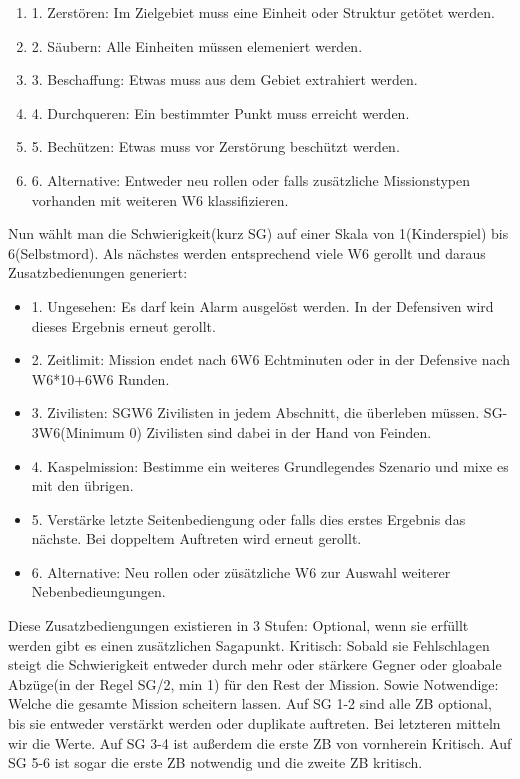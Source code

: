 \documentclass[twoside,a4paper]{minimal}
\begin{document}
\begin{multicols*}{3}
\begin{enumerate}
\item 1. Zerstören: Im Zielgebiet muss eine Einheit oder Struktur getötet werden.
\item 2. Säubern: Alle Einheiten müssen elemeniert werden.
\item 3. Beschaffung: Etwas muss aus dem Gebiet extrahiert werden.
\item 4. Durchqueren: Ein bestimmter Punkt muss erreicht werden.
\item 5. Bechützen: Etwas muss vor Zerstörung beschützt werden.
\item 6. Alternative: Entweder neu rollen oder falls zusätzliche Missionstypen vorhanden mit weiteren W6 klassifizieren.
\end{enumerate}
Nun wählt man die Schwierigkeit(kurz SG) auf einer Skala von 1(Kinderspiel) bis 6(Selbstmord). Als nächstes werden entsprechend viele W6 gerollt und daraus Zusatzbedienungen generiert:
\begin{itemize}
\item 1. Ungesehen: Es darf kein Alarm ausgelöst werden. In der Defensiven wird dieses Ergebnis erneut gerollt.
\item 2. Zeitlimit: Mission endet nach 6W6 Echtminuten oder in der Defensive nach W6*10+6W6 Runden.
\item 3. Zivilisten: SGW6 Zivilisten in jedem Abschnitt, die überleben müssen. SG-3W6(Minimum 0) Zivilisten sind dabei in der Hand von Feinden.
\item 4. Kaspelmission: Bestimme ein weiteres Grundlegendes Szenario und mixe es mit den übrigen.
\item 5. Verstärke letzte Seitenbediengung oder falls dies erstes Ergebnis das nächste. Bei doppeltem Auftreten wird erneut gerollt.
\item 6. Alternative: Neu rollen oder züsätzliche W6 zur Auswahl weiterer Nebenbedieungungen.
\end{itemize} 
Diese Zusatzbediengungen existieren in 3 Stufen: Optional, wenn sie erfüllt werden gibt es einen zusätzlichen Sagapunkt. Kritisch: Sobald sie Fehlschlagen steigt die Schwierigkeit entweder durch mehr oder stärkere Gegner oder gloabale Abzüge(in der Regel SG/2, min 1) für den Rest der Mission. Sowie Notwendige: Welche die gesamte Mission scheitern lassen. Auf SG 1-2 sind alle ZB optional, bis sie entweder verstärkt werden oder duplikate auftreten. Bei letzteren mitteln wir die Werte. Auf SG 3-4 ist außerdem die erste ZB von vornherein Kritisch. Auf SG 5-6 ist sogar die erste ZB notwendig und die zweite ZB kritisch.

\end{multicols*}
\end{document}
